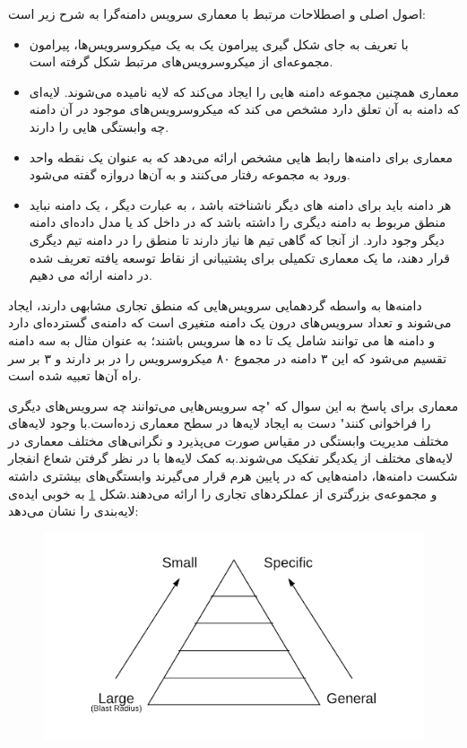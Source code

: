 اصول اصلی و اصطلاحات مرتبط با معماری سرویس دامنه‌گرا به شرح زیر است:
\begin{itemize}
\item 
با تعریف  به جای شکل گیری پیرامون یک به یک میکروسرویس‌ها، پیرامون مجموعه‌ای از میکروسرویس‌های مرتبط شکل گرفته است.
\item
معماری  همچنین مجموعه دامنه هایی را ایجاد می‌کند که لایه نامیده می‌شوند. لایه‌ای که دامنه به آن تعلق دارد مشخص می کند که میکروسرویس‌های موجود در آن دامنه چه وابستگی هایی را دارند.
\item
معماری برای دامنه‌ها رابط هایی مشخص ارائه می‌دهد که به عنوان یک نقطه واحد ورود به مجموعه رفتار می‌کنند و به آن‌ها دروازه گفته می‌شود.
\item
هر دامنه باید برای دامنه های دیگر ناشناخته باشد ، به عبارت دیگر ، یک دامنه نباید منطق مربوط به دامنه دیگری را داشته باشد که در داخل کد یا مدل داده‌‌ای دامنه دیگر وجود دارد. از آنجا که گاهی تیم ها نیاز دارند تا منطق را در دامنه تیم دیگری قرار دهند، ما یک معماری تکمیلی برای پشتیبانی از نقاط توسعه یافته تعریف شده در دامنه ارائه می دهیم.
\end{itemize}

دامنه‌ها به واسطه گردهمایی سرویس‌هایی که منطق تجاری مشابهی دارند، ایجاد می‌شوند و تعداد سرویس‌های درون یک دامنه متغیری است که دامنه‌ی گسترده‌ای دارد و دامنه ها می توانند شامل یک تا ده ها سرویس باشند؛ به عنوان مثال  به سه دامنه تقسیم می‌شود که این ۳ دامنه در مجموع ۸۰ میکروسرویس را در بر دارند و ۳  بر سر راه آن‌ها تعبیه شده است.

معماری  برای پاسخ به این سوال که "چه سرویس‌هایی می‌توانند چه سرویس‌های دیگری را فراخوانی کنند" دست به ایجاد لایه‌ها در سطح معماری زده‌است.با وجود لایه‌های مختلف مدیریت وابستگی در مقیاس صورت می‌پذیرد و نگرانی‌های مختلف معماری در لایه‌‌های مختلف از یکدیگر تفکیک می‌شوند.به کمک لایه‌ها با در نظر گرفتن شعاع انفجار شکست  دامنه‌ها، دامنه‌هایی که در پایین هرم قرار می‌گیرند وابستگی‌‌های بیشتری داشته و مجموعه‌ی بزرگتری از عملکرد‌‌های تجاری را ارائه می‌دهند.شکل \ref{fig:layers} به خوبی ایده‌ی لایه‌بندی را نشان می‌دهد:

\begin{figure}[h]
\label{fig:layers}
\centering
\includegraphics[scale=0.5]{layers.png}
\end{figure}

